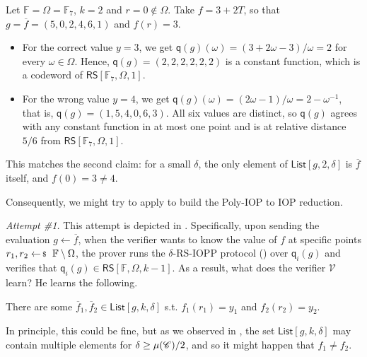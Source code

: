 \documentclass[../../book]{subfiles}
\begin{document}
\begin{example}
    Let $\mathbb{F} = \Omega = \mathbb{F}_7$, $k = 2$ and $r = 0 \notin \Omega$.
    Take $f = 3 + 2T$, so that $g = \overline{f} = (5, 0, 2, 4, 6, 1)$ and $f(r) = 3$.
    \begin{itemize}
        \item For the correct value $y = 3$, we get $\mathsf{q}(g)(\omega) = (3 + 2\omega - 3)/\omega = 2$ for every $\omega \in \Omega$. Hence, $\mathsf{q}(g) = (2, 2, 2, 2, 2, 2)$ is a constant function, which is a codeword of $\mathsf{RS}[\mathbb{F}_7, \Omega, 1]$.
        \item For the wrong value $y = 4$, we get $\mathsf{q}(g)(\omega) = (2\omega - 1)/\omega = 2 - \omega^{-1}$, that is, $\mathsf{q}(g) = (1, 5, 4, 0, 6, 3)$. All six values are distinct, so $\mathsf{q}(g)$ agrees with any constant function in at most one point and is at relative distance $5/6$ from $\mathsf{RS}[\mathbb{F}_7, \Omega, 1]$.
    \end{itemize}
    This matches the second claim: for a small $\delta$, the only element of $\mathsf{List}[g, 2, \delta]$ is $\overline{f}$ itself, and $f(0) = 3 \neq 4$.
\end{example}

Consequently, we might try to apply  to build the Poly-IOP to IOP reduction.

\textit{Attempt \#1.} This attempt is depicted in .
Specifically, upon sending the evaluation $g \gets \overline{f}$, when the verifier wants to know the value of $f$ at specific points $r_1,r_2 \leftarrowS \mathbb{F} \setminus \Omega$, the prover runs the $\delta$-RS-IOPP protocol () over $\mathsf{q}_i(g)$ and verifies that $\mathsf{q}_i(g) \in \mathsf{RS}[\mathbb{F},\Omega,k-1]$.
As a result, what does the verifier $\mathcal{V}$ learn? He learns the following.
\begin{bookquote}
  There are some $\overline{f}_1,\overline{f}_2 \in \mathsf{List}[g,k,\delta]$ s.t. $f_1(r_1)=y_1$ and $f_2(r_2)=y_2$.
\end{bookquote}

In principle, this could be fine, but as we observed in , the set $\mathsf{List}[g,k,\delta]$ may contain multiple elements for $\delta \geq \mu(\mathscr{C})/2$, and so it might happen that $f_1 \neq f_2$.
\end{document}
